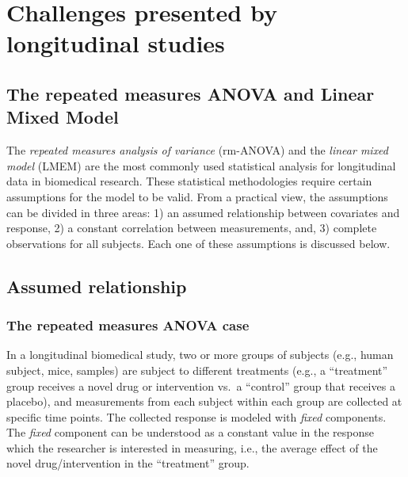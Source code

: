 \documentclass[
]{article}
\begin{document}
\hypertarget{challenges-presented-by-longitudinal-studies}{%
\section{Challenges presented by longitudinal studies}\label{challenges-presented-by-longitudinal-studies}}

\hypertarget{the-repeated-measures-anova-and-linear-mixed-model}{%
\subsection{The repeated measures ANOVA and Linear Mixed Model}\label{the-repeated-measures-anova-and-linear-mixed-model}}

The \emph{repeated measures analysis of variance} (rm-ANOVA) and the \emph{linear mixed model} (LMEM) are the most commonly used statistical analysis for longitudinal data in biomedical research. These statistical methodologies require certain assumptions for the model to be valid. From a practical view, the assumptions can be divided in three areas: 1) an assumed relationship between covariates and response, 2) a constant correlation between measurements, and, 3) complete observations for all subjects. Each one of these assumptions is discussed below.

\hypertarget{assumed-relationship}{%
\subsection{Assumed relationship}\label{assumed-relationship}}

\hypertarget{the-repeated-measures-anova-case}{%
\subsubsection{The repeated measures ANOVA case}\label{the-repeated-measures-anova-case}}

In a longitudinal biomedical study, two or more groups of subjects (e.g., human subject, mice, samples) are subject to different treatments (e.g., a ``treatment'' group receives a novel drug or intervention vs.~a ``control'' group that receives a placebo), and measurements from each subject within each group are collected at specific time points. The collected response is modeled with \emph{fixed} components. The \emph{fixed} component can be understood as a constant value in the response which the researcher is interested in measuring, i.e., the average effect of the novel drug/intervention in the ``treatment'' group.
\end{document}
